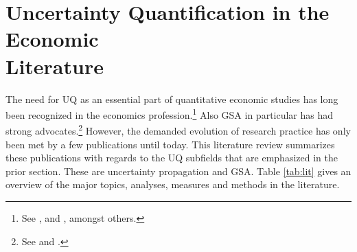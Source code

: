 \section{Uncertainty Quantification in the Economic \\ Literature}
\thispagestyle{plain} %

The need for UQ as an essential part of quantitative economic studies has long been recognized in the economics profession.\footnote{See \cite{Hansen.1996}, \cite{Kydland.1992} and \cite{Canova.1994}, amongst others.} Also GSA in particular has had strong advocates.\footnote{See \cite{Canova.1995} and \cite{Gregory.1995}.} However, the demanded evolution of research practice has only been met by a few publications until today. This literature review summarizes these publications with regards to the UQ subfields that are emphasized in the prior section. These are uncertainty propagation and GSA. Table \ref{tab:lit} gives an overview of the major topics, analyses, measures and methods in the literature.

